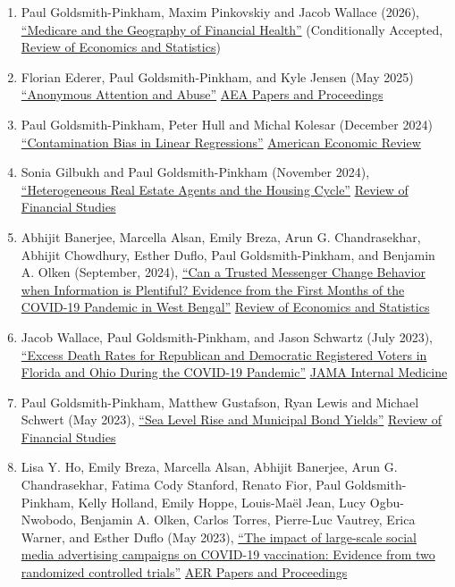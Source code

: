 \documentclass[letterpaper]{article}
\begin{document}
\begin{enumerate}
	\item Paul Goldsmith-Pinkham, Maxim Pinkovskiy and Jacob Wallace (2026), \href{http://paulgp.github.io/papers/GPW_compressed.pdf}{``Medicare and the Geography of Financial Health''} (Conditionally Accepted, \ul{Review of Economics and Statistics})
	\item Florian Ederer, Paul Goldsmith-Pinkham, and Kyle Jensen (May 2025) \href{https://florianederer.github.io/anonymous_P&P.pdf}{``Anonymous Attention and Abuse''} \ul{AEA Papers and Proceedings}
	\item Paul Goldsmith-Pinkham, Peter Hull and Michal Kolesar (December 2024) \href{https://arxiv.org/abs/2106.05024}{``Contamination Bias in Linear Regressions''} \ul{American Economic Review}
	\item Sonia Gilbukh and Paul Goldsmith-Pinkham (November 2024), \href{http://paulgp.github.io/papers/Heterogeneous_Real_Estate_Agents_and_the_Housing_Cycle.pdf}{``Heterogeneous Real Estate Agents and the Housing Cycle''} \ul{Review of Financial Studies}
	\item Abhijit Banerjee, Marcella Alsan, Emily Breza, Arun G. Chandrasekhar, Abhijit Chowdhury, Esther Duflo, Paul Goldsmith-Pinkham, and Benjamin A. Olken (September, 2024), \href{https://economics.mit.edu/sites/default/files/2022-08/wb_manuscript_final.pdf}{``Can a Trusted Messenger Change Behavior when Information is Plentiful? Evidence from the First Months of the COVID-19 Pandemic in West Bengal''}   \ul{Review of Economics and Statistics}
	\item Jacob Wallace, Paul Goldsmith-Pinkham, and Jason Schwartz (July 2023), \href{https://jamanetwork.com/journals/jamainternalmedicine/fullarticle/2807617}{``Excess Death Rates for Republican and Democratic Registered Voters in Florida and Ohio During the COVID-19 Pandemic''} \ul{JAMA Internal Medicine}
	\item Paul Goldsmith-Pinkham, Matthew Gustafson, Ryan Lewis and Michael Schwert (May 2023), \href{http://paulgp.github.io/papers/ggls_munis.pdf}{``Sea Level Rise and Municipal Bond Yields''} \ul{Review of Financial Studies}
	\item Lisa Y. Ho, Emily Breza, Marcella Alsan, Abhijit Banerjee, Arun G. Chandrasekhar, Fatima Cody Stanford, Renato Fior, Paul Goldsmith-Pinkham, Kelly Holland, Emily Hoppe, Louis-Maël Jean, Lucy Ogbu-Nwobodo, Benjamin A. Olken, Carlos Torres, Pierre-Luc Vautrey, Erica Warner, and Esther Duflo (May 2023), \href{https://paulgp.github.io/papers/submission_manuscript_appendix_social_media_covid_vaccines.pdf}{``The impact of large-scale social media advertising campaigns on COVID-19 vaccination: Evidence from two randomized controlled trials''} \ul{AER Papers and Proceedings}

\end{enumerate}
\end{document}
